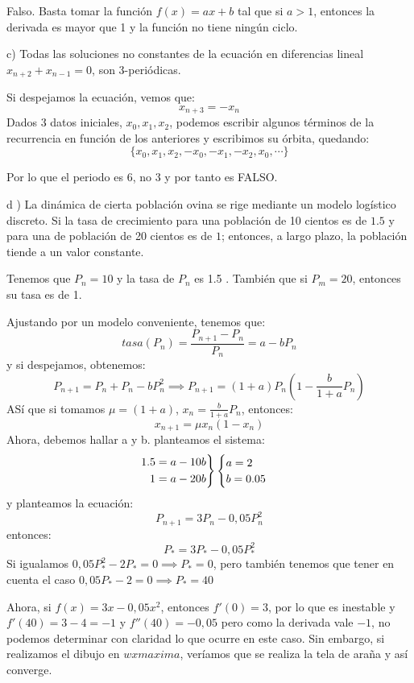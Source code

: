 \documentclass[11pt, a4paper, titlepage]{article}
\theoremstyle{theorem-style}
\theoremstyle{definition-style}
\theoremstyle{remark-style}
\theoremstyle{example-style}
\newenvironment{rcases}
  {\left.\begin{aligned}}
  {\end{aligned}\right\rbrace}
\begin{document}
Falso. Basta tomar la función $f(x) = ax+b$ tal que si $a>1$, entonces la derivada es mayor que 1 y la función no tiene ningún ciclo.

c) Todas las soluciones no constantes de la ecuación en diferencias lineal $x_{n+2}+ x_{n-1} = 0$, son 3-periódicas.

Si despejamos la ecuación, vemos que:
\[
x_{n+3} = -x_n
\]
Dados 3 datos iniciales, $x_0,x_1,x_2$, podemos escribir algunos términos de la recurrencia en función de los anteriores y escribimos su órbita, quedando:
\[
\{x_0,x_1,x_2,-x_0,-x_1,-x_2,x_0,\cdots\}
\]

Por lo que el periodo es 6, no 3 y por tanto es FALSO.

d ) La dinámica de cierta población ovina se rige mediante un modelo logístico discreto. Si la tasa de crecimiento
para una población de 10 cientos es de $1.5$ y para una de población de 20 cientos es de $1$; entonces, a largo plazo, la población tiende a un valor constante.

Tenemos que $P_n=10$ y la tasa de $P_n$ es 1.5 . También que si $P_m = 20$, entonces su tasa es de 1.

Ajustando por un modelo conveniente, tenemos que:
\[
tasa(P_n) = \frac{P _{n+1} - P_n}{P_n} = a -bP_n
\]
y si despejamos, obtenemos:
\[
P _{n+1} = P_n + P_n -b P_n^2 \implies P _{n+1} = (1+a)P_n(1-\frac{b}{1+a}P_n)
\]
ASí que si tomamos $\mu = (1+a)$, $x_n = \frac{b}{1+a}P_n$, entonces:
\[
x _{n+1} = \mu x_n (1-x_n)
\]
Ahora, debemos hallar a y b. planteamos el sistema:
\[
\begin{rcases}
	1.5 = a-10b\\
	1 = a-20b
\end{rcases} 
\begin{cases}
	a = 2 \\
	b = 0.05
\end{cases}
\]
y planteamos la ecuación:
\[
P _{n+1} = 3P_n - 0,05 P_n^2
\]
entonces:
\[
P_* = 3P_* - 0,05P_*^2
\]
Si igualamos $0,05P_*^2 -2P_* = 0 \implies P_* = 0$, pero también tenemos que tener en cuenta el caso $0,05P_* - 2 = 0 \implies P_* = 40$

Ahora, si $f(x) = 3x - 0,05x^2$, entonces $f'(0) = 3$, por lo que es inestable y $f'(40) =3-4 = -1$ y $f''(40) = -0,05$
pero como la derivada vale $-1$, no podemos determinar con claridad lo que ocurre en este caso. Sin embargo, si realizamos el dibujo en $wxmaxima$, veríamos que se realiza la tela de araña y así converge.



\end{document}
